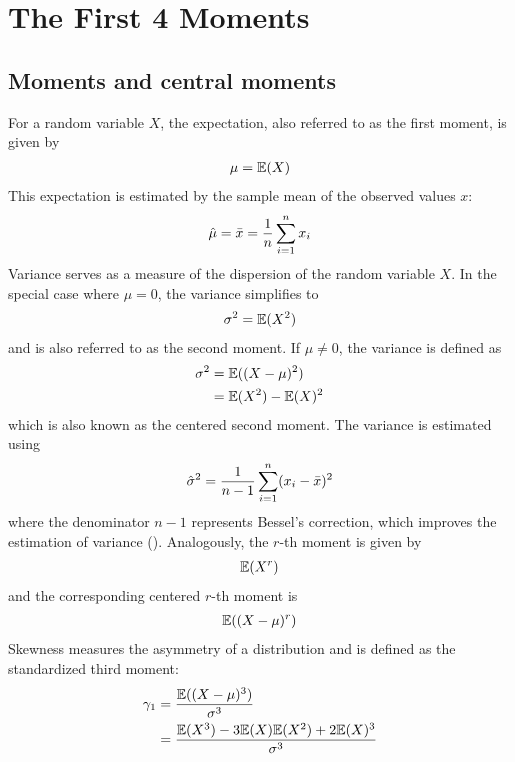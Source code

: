 \chapter{The First 4 Moments}
\label{sec:moments}

\section{Moments and central moments}

For a random variable $X$, the expectation, also referred to as the first moment, is given by
\begin{align}
    \mu = \mathbb{E}(X)\notag
\end{align}
This expectation is estimated by the sample mean of the observed values $x$:
\begin{align}
    \hat{\mu} = \bar{x} = \frac{1}{n}\sum_{i=1}^{n}x_i\notag
\end{align}
Variance serves as a measure of the dispersion of the random variable $X$. In the special case where $\mu = 0$, the variance simplifies to
\begin{align}
    \sigma^2 = \mathbb{E}(X^2)\notag
\end{align}
and is also referred to as the second moment. If $\mu \neq 0$, the variance is defined as
\begin{align}
    \label{eq:definition_variance}
    \sigma^2 &= \mathbb{E}((X-\mu)^2) \\
    &= \mathbb{E}(X^2) - \mathbb{E}(X)^2 \notag
\end{align}
which is also known as the centered second moment. The variance is estimated using
\begin{align}
    \hat{\sigma}^2 = \frac{1}{n-1}\sum_{i=1}^{n}(x_i-\bar{x})^2\notag
\end{align}
where the denominator $n-1$ represents Bessel's correction, which improves the estimation of variance (\cite{radziwillStatisticsEasierWay2017}). Analogously, the $r$-th moment is given by
\begin{align}
    \mathbb{E}(X^r)\notag
\end{align}
and the corresponding centered $r$-th moment is
\begin{align}
    \mathbb{E}((X-\mu)^r)\notag
\end{align}
Skewness measures the asymmetry of a distribution and is defined as the standardized third moment:
\begin{align}
    \label{eq:definition_skewness}
    \gamma_1 &= \frac{\mathbb{E}((X-\mu)^3)}{\sigma^3} \\
    &= \frac{\mathbb{E}(X^3) - 3\mathbb{E}(X)\mathbb{E}(X^2) + 2\mathbb{E}(X)^3}{\sigma^3} \notag
\end{align}
